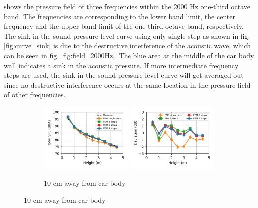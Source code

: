 \noindent{} shows the pressure field of three frequencies within the 2000 Hz one-third octave band. The frequencies are corresponding to the lower band limit, the center frequency and the upper band limit of the one-third octave band, respectively. The sink in the sound pressure level curve using only single step as shown in fig. \ref{fig:curve_sink} is due to the destructive interference of the acoustic wave, which can be seen in fig. \ref{fig:field_2000Hz}. The blue area at the middle of the car body wall indicates a sink in the acoustic pressure. If more intermediate frequency steps are used, the sink in the sound pressure level curve will get averaged out since no destructive interference occurs at the same location in the pressure field of other frequencies.

\begin{figure}[H]
	\begin{subfigure}[b]{\textwidth}
		\centering
		\includegraphics[width=0.49\textwidth]{fig/chap5/freq_steps/overall_SPL/pos_a.png}
		\includegraphics[width=0.49\textwidth]{fig/chap5/freq_steps/overall_SPL/pos_a_deviation.png}
		\caption{10 cm away from car body}
	\end{subfigure}
\end{figure}
